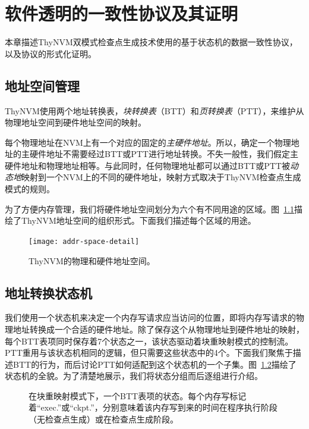 \chapter{软件透明的一致性协议及其证明}
\label{chap:protocol}

本章描述ThyNVM双模式检查点生成技术使用的基于状态机的数据一致性协议，以及协议的形式化证明。

\section{地址空间管理}

ThyNVM使用两个地址转换表，\emph{块转换表}（BTT）和\emph{页转换表}（PTT），来维护从物理地址空间到硬件地址空间的映射。

每个物理地址在NVM上有一个对应的固定的\emph{主硬件地址}。所以，确定一个物理地址的主硬件地址不需要经过BTT或PTT进行地址转换。不失一般性，我们假定主硬件地址和物理地址相等。与此同时，任何物理地址都可以通过BTT或PTT被\emph{动态地}映射到一个NVM上的不同的硬件地址，映射方式取决于ThyNVM检查点生成模式的规则。

为了方便内存管理，我们将硬件地址空间划分为六个有不同用途的区域。图~\ref{fig:addr-space-detail}描绘了ThyNVM地址空间的组织形式。下面我们描述每个区域的用途。

\begin{figure}[!h]
\centering
\texttt{[image: addr-space-detail]}
\caption{ThyNVM的物理和硬件地址空间。}
\label{fig:addr-space-detail}
\end{figure}

\section{地址转换状态机}

我们使用一个状态机来决定一个内存写请求应当访问的位置，即将内存写请求的物理地址转换成一个合适的硬件地址。除了保存这个从物理地址到硬件地址的映射，每个BTT表项同时保存着7个状态之一，该状态驱动着块重映射模式的控制流。PTT重用与该状态机相同的逻辑，但只需要这些状态中的4个。下面我们聚焦于描述BTT的行为，而后讨论PTT如何适配到这个状态机的一个子集。图~\ref{fig-state-machine}描绘了状态机的全貌。为了清楚地展示，我们将状态分组而后逐组进行介绍。

\begin{figure}[!t]
\centering

\caption{在块重映射模式下，一个BTT表项的状态。每个内存写标记着``exec.''或``ckpt.''，分别意味着该内存写到来的时间在程序执行阶段（无检查点生成）或在检查点生成阶段。}
\label{fig-state-machine}
\end{figure}

